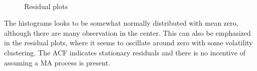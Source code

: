 \begin{figure}[H]
  \centering
  \quad
  \\
  \quad
  \caption{Residual plots}
  \label{fig:plot_over_residuals}
\end{figure}
\noindent The histograms looks to be somewhat normally distributed with mean zero, although there are many observation in the center. This can also be emphasized in the residual plots, where it seems to oscillate around zero with some volatility clustering.
The ACF indicates stationary residuals and there is no incentive of assuming a MA process is present.


